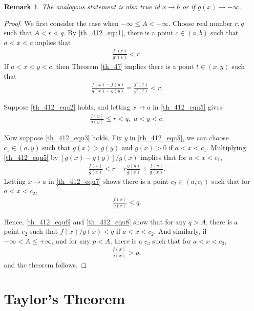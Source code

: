 \documentclass[11pt]{book}
\newtheorem{remark}{Remark}[chapter]
\theoremstyle{definition}
\numberwithin{equation}{chapter}
\begin{document}
\begin{remark}
The analogous statement is also true id $x \to b$ or if $g(x) \to -\infty$.
\end{remark}

\begin{proof}
We first consider the case when $- \infty \leq A < +\infty$. Choose real number $r, q$ such that $A < r < q$. By \eqref{th_412_equ1}, there is a point $c \in (a,b)$ such that $a < x < c$ implies that 
\begin{align*}
    \frac{f'(c)}{g'(c)} < r.
\end{align*}
If $a < x < y < c$, then Theorem \ref{th_47} implies there is a point $t \in (x,y)$ such that \begin{align}\label{th_412_equ5}
    \frac{f(x) - f(y)}{g(x) - g(y)} = \frac{f'(t)}{g'(t)} < r.
\end{align}

Suppose \eqref{th_412_equ2} holds, and letting $x \to a$ in \eqref{th_412_equ5} gives
\begin{align}\label{th_412_equ6}
    \frac{f(y)}{g(y)} \leq r < q,  \,\, a < y < c.
\end{align}

Now suppose \eqref{th_412_equ3} holds. Fix $y$ in \eqref{th_412_equ5}, we can choose $c_1 \in (a,y)$ such that $g(x) > g(y)$ and $g(x) > 0$ if $a < x < c_1$. Multiplying \eqref{th_412_equ5} by $[g(x) - g(y)]/g(x)$ implies that for $a < x < c_1$,
\begin{align}\label{th_412_equ7}
    \frac{f(x)}{g(x)} < r - r \frac{g(y)}{g(x)} + \frac{f(y)}{g(x)}.
\end{align}
Letting $x \to a$ in \eqref{th_412_equ7} shows there is a point $c_2 \in (a,c_1)$ such that for $a < x < c_2$,
\begin{align}\label{th_412_equ8}
    \frac{f(x)}{g(x)} < q.
\end{align}

Hence, \eqref{th_412_equ6} and \eqref{th_412_equ8} show that for any $q > A$, there is a point $c_2$ such that $f(x)/g(x) < q$ if $a < x < c_2$. And similarly, if $-\infty < A \leq + \infty$, and for any $p < A$, there is a $c_3$ such that for $a < x < c_3$,
\begin{align*}
    \frac{f(x)}{g(x)} > p,
\end{align*}
and the theorem follows.
\end{proof}

\medskip


\section{Taylor's Theorem}
\end{document}
